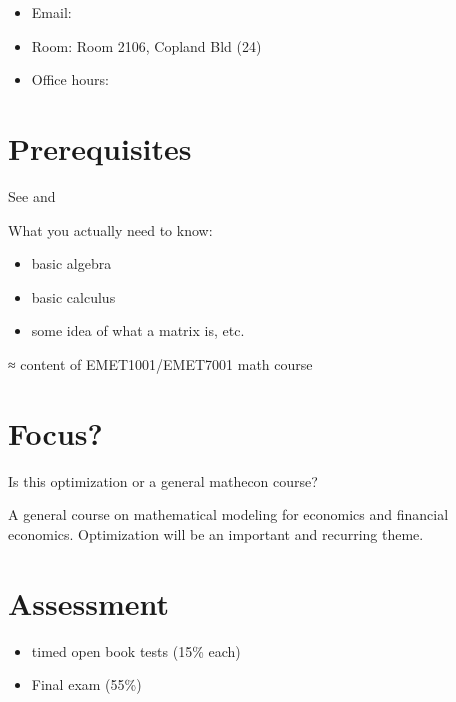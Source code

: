 \documentclass[letterpaper,10pt,english]{jupyterBook}
\begin{document}
\sphinxAtStartPar
{}
\begin{itemize}
\item {} 
\sphinxAtStartPar
Email: 

\item {} 
\sphinxAtStartPar
Room: Room 2106, Copland Bld (24)

\item {} 
\sphinxAtStartPar
Office hours: 

\end{itemize}


\section{Prerequisites}
\label{\detokenize{01.introduction:prerequisites}}
\sphinxAtStartPar
See  and

\sphinxAtStartPar
What you actually need to know:
\begin{itemize}
\item {} 
\sphinxAtStartPar
basic algebra

\item {} 
\sphinxAtStartPar
basic calculus

\item {} 
\sphinxAtStartPar
some idea of what a matrix is, etc.

\end{itemize}

\sphinxAtStartPar
≈ content of EMET1001/EMET7001 math course


\section{Focus?}
\label{\detokenize{01.introduction:focus}}
\sphinxAtStartPar
{} Is this optimization or a general math\sphinxhyphen{}econ course?

\sphinxAtStartPar
{} A general course on mathematical modeling for economics and financial economics. Optimization will be an important and recurring theme.


\section{Assessment}
\label{\detokenize{01.introduction:assessment}}\begin{itemize}
\item {} 
 timed open book tests (15\% each)

\item {} 
\sphinxAtStartPar
Final exam (55\%)

\end{itemize}
\end{document}
